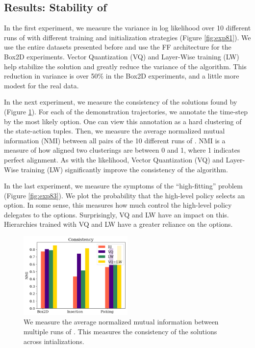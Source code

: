 \subsection*{Results: Stability of \alg}
In the first experiment, we measure the variance in log likelihood over 10 different runs of \alg with different training and initialization strategies (Figure \ref{fig:exp81}). 
We use the entire datasets presented before and use the FF architecture for the Box2D experiments.
Vector Quantization (VQ) and Layer-Wise training (LW) help stabilize the solution and greatly reduce the variance of the algorithm.
This reduction in variance is over 50\% in the Box2D experiments, and a little more modest for the real data.

In the next experiment, we measure the consistency of the solutions found by \alg (Figure \ref{fig:exp82}).
For each of the demonstration trajectories, we annotate the time-step by the most likely option.
One can view this annotation as a hard clustering of the state-action tuples.
Then, we measure the average normalized mutual information (NMI) between all pairs of the 10 different runs of \alg.
NMI is a measure of how aligned two clusterings are between 0 and 1, where 1 indicates perfect alignment.
As with the likelihood, Vector Quantization (VQ) and Layer-Wise training (LW) significantly improve the consistency of the algorithm.


In the last experiment, we measure the symptoms of the ``high-fitting'' problem (Figure \ref{fig:exp83}).
We plot the probability that the high-level policy selects an option.
In some sense, this measures how much control the high-level policy delegates to the options.
Surprisingly, VQ and LW have an impact on this.
Hierarchies trained with VQ and LW have a greater reliance on the options.

\begin{figure} [ht!]
\centering
    \includegraphics[width=0.5\textwidth]{ddco-experiments/exp8-2.png}
    \caption{We measure the average normalized mutual information between multiple runs of \alg. This measures the consistency of the solutions across intializations. \label{fig:exp82}}
\end{figure}


